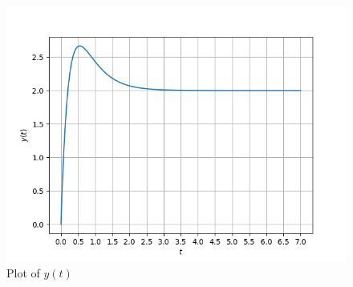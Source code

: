 \documentclass[journal,12pt,twocolumn]{IEEEtran}
\theoremstyle{remark}
\begin{document}
\begin{figure}[htbp]
	\includegraphics[width=\columnwidth]{figs/plot.png}
	\caption{Plot of $y(t)$}
	\label{fig:plot_ch60}
\end{figure}
\end{document}
